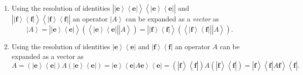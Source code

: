 \documentclass[aps,preprint]{revtex4}%
\begin{document}
\begin{enumerate}
\item Using the resolution of identities $\left\vert \overset{}{\left\vert
\mathbf{e}\right\rangle \left\langle \mathbf{e}\right\vert }\right\rangle
\left\langle \overset{}{\left\vert \mathbf{e}\right\rangle \left\langle
\mathbf{e}\right\vert }\right\vert $ and $\left\vert \overset{}{\left\vert
\mathbf{f}\right\rangle \left\langle \mathbf{f}\right\vert }\right\rangle
\left\langle \overset{}{\left\vert \mathbf{f}\right\rangle \left\langle
\mathbf{f}\right\vert }\right\vert $ an operator $\left\vert A\right\rangle $
can be expanded as a \emph{vector} as
\begin{equation}
\left\vert A\right\rangle =\left\vert \overset{}{\left\vert \mathbf{e}%
\right\rangle \left\langle \mathbf{e}\right\vert }\right\rangle \left(
\left\langle \overset{}{\left\vert \mathbf{e}\right\rangle \left\langle
\mathbf{e}\right\vert }\right\vert \left\vert \overset{}{A}\right\rangle
\right)  =\left\vert \overset{}{\left\vert \mathbf{f}\right\rangle
\left\langle \mathbf{f}\right\vert }\right\rangle \left(  \left\langle
\overset{}{\left\vert \mathbf{f}\right\rangle \left\langle \mathbf{f}%
\right\vert }\right\vert \left\vert \overset{}{A}\right\rangle \right)  .
\end{equation}


\item Using the resolution of identities $\left\vert \mathbf{e}\right\rangle
\left\langle \mathbf{e}\right\vert $ and $\left\vert \mathbf{f}\right\rangle
\left\langle \mathbf{f}\right\vert $ an operator $A$ can be expanded as a
vector as%
\begin{equation}
A=\left(  \left\vert \overset{}{\mathbf{e}}\right\rangle \left\langle
\overset{}{\mathbf{e}}\right\vert \right)  A\left(  \left\vert
\overset{}{\mathbf{e}}\right\rangle \left\langle \overset{}{\mathbf{e}%
}\right\vert \right)  =\left\vert \overset{}{\mathbf{e}}\right\rangle
\left\langle \left.  \overset{}{\mathbf{e}}\right\vert A\mathbf{e}%
\right\rangle \left\langle \overset{}{\mathbf{e}}\right\vert =\left(
\left\vert \overset{}{\mathbf{f}}\right\rangle \left\langle
\overset{}{\mathbf{f}}\right\vert \right)  A\left(  \left\vert
\overset{}{\mathbf{f}}\right\rangle \left\langle \overset{}{\mathbf{f}%
}\right\vert \right)  =\left\vert \overset{}{\mathbf{f}}\right\rangle
\left\langle \left.  \overset{}{\mathbf{f}}\right\vert A\mathbf{f}%
\right\rangle \left\langle \overset{}{\mathbf{f}}\right\vert .
\end{equation}



\end{enumerate}
\end{document}
